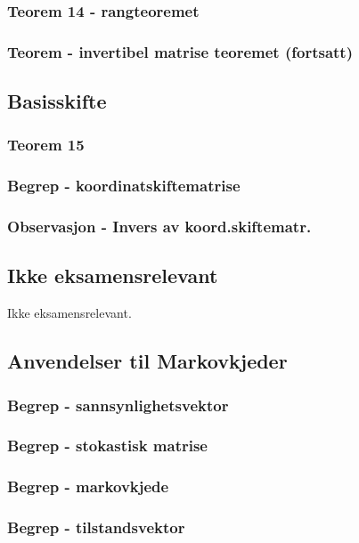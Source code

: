 \documentclass{article}
\begin{document}
      \subsubsection{Teorem 14 - rangteoremet}
        
      \subsubsection{Teorem - invertibel matrise teoremet (fortsatt)}
        
    \subsection{Basisskifte}
      \subsubsection{Teorem 15}
        
      \subsubsection{Begrep - koordinatskiftematrise}
        
      \subsubsection{Observasjon - Invers av koord.skiftematr.}
        
    \subsection{Ikke eksamensrelevant}
      Ikke eksamensrelevant.
    \subsection{Anvendelser til Markovkjeder}
      \subsubsection{Begrep - sannsynlighetsvektor}
        
      \subsubsection{Begrep - stokastisk matrise}
        
      \subsubsection{Begrep - markovkjede}
        
      \subsubsection{Begrep - tilstandsvektor}
        
\end{document}
